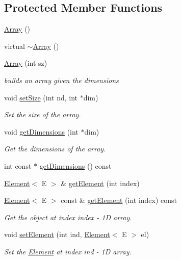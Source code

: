 \subsection*{Protected Member Functions}
\begin{DoxyCompactItemize}
\item 
\hyperlink{classbridges_1_1datastructure_1_1_array_a23cb659c4f39e5e6f3b29a58e97b8e0d}{Array} ()
\item 
virtual \hyperlink{classbridges_1_1datastructure_1_1_array_a5a9f212f560e9673259eece27d8f11cc}{$\sim$\+Array} ()
\item 
\hyperlink{classbridges_1_1datastructure_1_1_array_ad72d4311346c5b9e53ee8eff2a4aadce}{Array} (int sz)
\begin{DoxyCompactList}\small\item\em builds an array given the dimensions \end{DoxyCompactList}\item 
void \hyperlink{classbridges_1_1datastructure_1_1_array_a2bfb10e98b1745a7ca173459626352a9}{set\+Size} (int nd, int $\ast$dim)
\begin{DoxyCompactList}\small\item\em Set the size of the array. \end{DoxyCompactList}\item 
void \hyperlink{classbridges_1_1datastructure_1_1_array_aa2a14939c8e53087e833ebf71822a057}{get\+Dimensions} (int $\ast$dim)
\begin{DoxyCompactList}\small\item\em Get the dimensions of the array. \end{DoxyCompactList}\item 
int const  $\ast$ \hyperlink{classbridges_1_1datastructure_1_1_array_a6d9edc546fa172a47f19de3c2ea93ebf}{get\+Dimensions} () const
\item 
\hyperlink{classbridges_1_1datastructure_1_1_element}{Element}$<$ E $>$ \& \hyperlink{classbridges_1_1datastructure_1_1_array_aaf44dbc671651d6e1383d1c523348f28}{get\+Element} (int index)
\item 
\hyperlink{classbridges_1_1datastructure_1_1_element}{Element}$<$ E $>$ const  \& \hyperlink{classbridges_1_1datastructure_1_1_array_ad2704d36d824ef7356fda5f6d7974ba7}{get\+Element} (int index) const
\begin{DoxyCompactList}\small\item\em Get the object at index index -\/ 1D array. \end{DoxyCompactList}\item 
void \hyperlink{classbridges_1_1datastructure_1_1_array_a120174198dc4de388af154d97951e856}{set\+Element} (int ind, \hyperlink{classbridges_1_1datastructure_1_1_element}{Element}$<$ E $>$ el)
\begin{DoxyCompactList}\small\item\em Set the \hyperlink{classbridges_1_1datastructure_1_1_element}{Element} at index ind -\/ 1D array. \end{DoxyCompactList}\end{DoxyCompactItemize}
